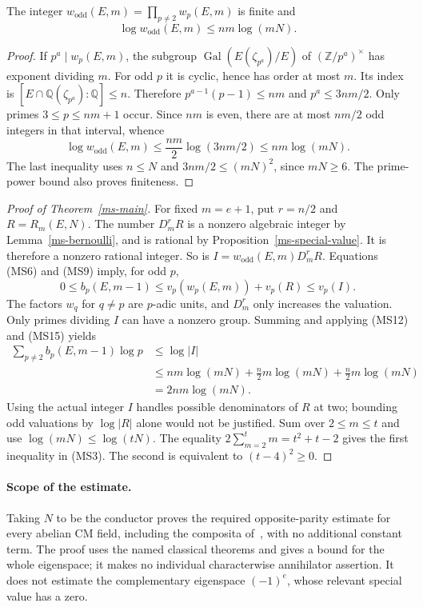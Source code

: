 \begin{lemma}\label{ms-roots}
The integer $w_{\mathrm{odd}}(E,m)=\prod_{p\ne2}w_p(E,m)$
is finite and
\[
             \log w_{\mathrm{odd}}(E,m)\le nm\log(mN).
 \tag{MS15}
\]
\end{lemma}
\begin{proof}
If $p^a\mid w_p(E,m)$, the subgroup
$\operatorname{Gal}(E(\zeta_{p^a})/E)$ of
$(\mathbb Z/p^a)^\times$ has exponent dividing $m$.
For odd $p$ it is cyclic, hence has order at most $m$.
Its index is
$[E\cap\mathbb Q(\zeta_{p^a}):\mathbb Q]\le n$.
Therefore $p^{a-1}(p-1)\le nm$ and
$p^a\le3nm/2$.
Only primes $3\le p\le nm+1$ occur.
Since $nm$ is even, there are at most $nm/2$ odd integers
in that interval, whence
\[
 \log w_{\mathrm{odd}}(E,m)
       \le\frac{nm}{2}\log(3nm/2)\le nm\log(mN).
\]
The last inequality uses $n\le N$ and
$3nm/2\le(mN)^2$, since $mN\ge6$.
The prime-power bound also proves finiteness.
\end{proof}

\begin{proof}[Proof of Theorem~\ref{ms-main}]
For fixed $m=e+1$, put $r=n/2$ and $R=R_m(E,N)$.
The number $D_m^rR$ is a nonzero algebraic integer by
Lemma~\ref{ms-bernoulli}, and is rational by
Proposition~\ref{ms-special-value}.  It is therefore a
nonzero rational integer.  So is
$I=w_{\mathrm{odd}}(E,m)D_m^rR$.
Equations (MS6) and (MS9) imply, for odd $p$,
\[
 0\le b_p(E,m-1)\le
       v_p(w_p(E,m))+v_p(R)\le v_p(I).
 \tag{MS16}
\]
The factors $w_q$ for $q\ne p$ are $p$-adic units,
and $D_m^r$ only increases the valuation.
Only primes dividing $I$ can have a nonzero group.
Summing and applying (MS12) and (MS15) yields
\[
 \begin{split}
 \sum_{p\ne2}b_p(E,m-1)\log p
 &\le\log|I|\\
 &\le nm\log(mN)+\frac n2 m\log(mN)+\frac n2 m\log(mN)\\
 &=2nm\log(mN).
 \end{split}
 \tag{MS17}
\]
Using the actual integer $I$ handles possible denominators
of $R$ at two; bounding odd valuations by $\log|R|$ alone
would not be justified.
Sum over $2\le m\le t$ and use
$\log(mN)\le\log(tN)$.
The equality $2\sum_{m=2}^t m=t^2+t-2$ gives the first
inequality in (MS3).
The second is equivalent to $(t-4)^2\ge0$.
\end{proof}

\paragraph{Scope of the estimate.}
Taking $N$ to be the conductor proves the required
opposite-parity estimate for every abelian CM field, including
the composita of~\cite{alpo-uniform-source}, with no additional
constant term.  The proof uses the named classical theorems
and gives a bound for the whole eigenspace; it makes no
individual characterwise annihilator assertion.
It does not estimate the complementary eigenspace
$(-1)^e$, whose relevant special value has a zero.


